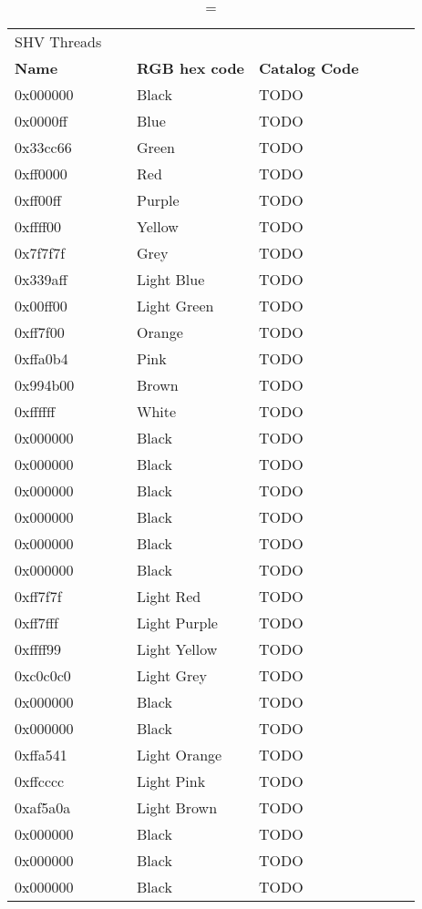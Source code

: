 
\begin{longtable}{p{0.3\linewidth} p{0.3\linewidth} p{0.4\linewidth}}
\caption = {SHV Threads}
\label{tblr:shv}\\
\textbf{Name} & \textbf{RGB hex code} & \textbf{Catalog Code} \\
0x000000 &  Black &         TODO\\
0x0000ff &  Blue &          TODO\\
0x33cc66 &  Green &         TODO\\
0xff0000 &  Red &           TODO\\
0xff00ff &  Purple &        TODO\\
0xffff00 &  Yellow &        TODO\\
0x7f7f7f &  Grey &          TODO\\
0x339aff &  Light Blue &    TODO\\
0x00ff00 &  Light Green &   TODO\\
0xff7f00 &  Orange &        TODO\\
0xffa0b4 &  Pink &          TODO\\
0x994b00 &  Brown &         TODO\\
0xffffff &  White &         TODO\\
0x000000 &  Black &         TODO\\
0x000000 &  Black &         TODO\\
0x000000 &  Black &         TODO\\
0x000000 &  Black &         TODO\\
0x000000 &  Black &         TODO\\
0x000000 &  Black &         TODO\\
0xff7f7f &  Light Red &     TODO\\
0xff7fff &  Light Purple &  TODO\\
0xffff99 &  Light Yellow &  TODO\\
0xc0c0c0 &  Light Grey &    TODO\\
0x000000 &  Black &         TODO\\
0x000000 &  Black &         TODO\\
0xffa541 &  Light Orange &  TODO\\
0xffcccc &  Light Pink &    TODO\\
0xaf5a0a &  Light Brown &   TODO\\
0x000000 &  Black &         TODO\\
0x000000 &  Black &         TODO\\
0x000000 &  Black &         TODO\\

\end{longtable}
